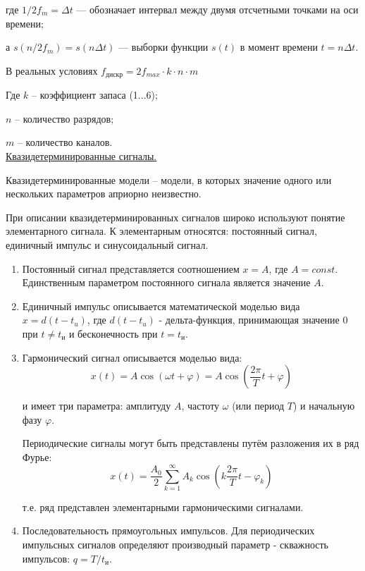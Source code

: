 \documentclass[unicode, 12pt, a4paper, oneside]{article}
\begin{document}
где $1/2f_m=\Delta t$ — обозначает интервал между двумя отсчетными точками на оси времени;

а $s(n/2f_m)=s(n\Delta t)$ — выборки функции $s(t)$ в момент времени $t=n\Delta t$.

В реальных условиях $f_\text{дискр} = 2f_{max} \cdot k \cdot n \cdot m$

Где $k$ – коэффициент запаса (1...6);

$n$ – количество разрядов;

$m$ – количество каналов.\\

\underline{Квазидетерминированные сигналы.}

Квазидетерминированные модели – модели, в которых значение одного или нескольких параметров априорно неизвестно.

При описании квазидетерминированных сигналов широко используют понятие элементарного сигнала. 
К элементарным относятся: постоянный сигнал, единичный импульс и синусоидальный сигнал.
\begin{enumerate}
\item Постоянный сигнал представляется соотношением $x = A$, где $A = const$. Единственным параметром постоянного сигнала является значение $A$.
\item Единичный импульс описывается математической моделью вида $x=d(t-t_u)$,
где $d(t-t_u)$ - дельта-функция, принимающая значение 0 при $t \neq t_\text{и}$ и бесконечность при $t=t_\text{и}$.
\item Гармонический сигнал описывается моделью вида: 
\begin{displaymath}
x(t)= A\cos (\omega t+\varphi)=A\cos (\frac{2\pi}{T} t+\varphi)
\end{displaymath}

и имеет три параметра: амплитуду $A$, частоту $\omega$ (или период $T$) и начальную фазу $\varphi$.

Периодические сигналы могут быть представлены путём разложения их в ряд Фурье:
\begin{displaymath}
x(t)= \frac{A_0}{2} \sum_{k=1}^{\infty} A_k\cos (k \frac{2\pi}{T} t-\varphi_k)
\end{displaymath}

т.е. ряд представлен элементарными гармоническими сигналами.
\item Последовательность прямоугольных импульсов. Для периодических импульсных сигналов определяют производный параметр - скважность импульсов: $q=T/t_\text{и}$.
\end{enumerate}
\end{document}
